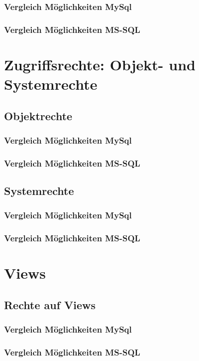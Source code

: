 \documentclass[11pt,a4paper,parskip=half]{scrartcl}
\begin{document}
\subsubsection{Vergleich Möglichkeiten MySql}
\subsubsection{Vergleich Möglichkeiten MS-SQL}

\section{Zugriffsrechte: Objekt- und Systemrechte}

\subsection{Objektrechte}
\subsubsection{Vergleich Möglichkeiten MySql}
\subsubsection{Vergleich Möglichkeiten MS-SQL}

\subsection{Systemrechte}
\subsubsection{Vergleich Möglichkeiten MySql}
\subsubsection{Vergleich Möglichkeiten MS-SQL}

\section{Views}
\subsection{Rechte auf Views}
\subsubsection{Vergleich Möglichkeiten MySql}
\subsubsection{Vergleich Möglichkeiten MS-SQL}
\end{document}
